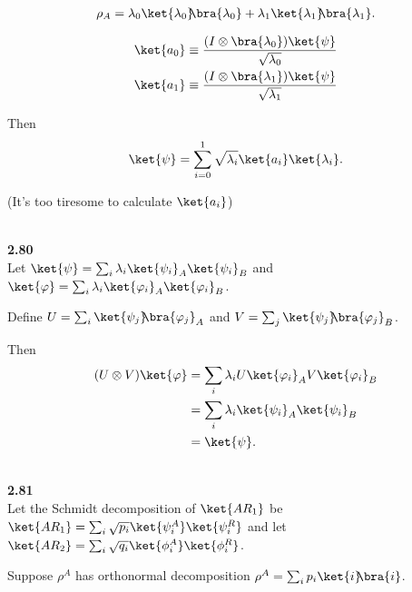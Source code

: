 \documentclass[10pt]{book}
\newcommand{\kb}[1]{\ket{#1}\hspace{-1mm} \bra{#1}} %
\newcommand{\kbt}[2]{\ket{#1}\hspace{-1mm} \bra{#2}} %
\newcommand{\Textbf}[1]{\hspace{3mm}\\ \textbf{#1}\\}
\begin{document}
	\begin{equation}
\begin{aligned}
		\rho_A = \lambda_0 \kb{\lambda_0} + \lambda_1 \kb{\lambda_1}.
	\end{aligned}
\end{equation}
	
	
	\begin{equation}
\begin{aligned}
		\ket{a_0} \equiv \frac{(I \otimes \bra{\lambda_0}) \ket{\psi} }{\sqrt{\lambda_0}}\\
		\ket{a_1} \equiv \frac{(I \otimes \bra{\lambda_1}) \ket{\psi} }{\sqrt{\lambda_1}}
	\end{aligned}
\end{equation}
	
	Then
	\begin{equation}
\begin{aligned}
		\ket{\psi} = \sum_{i=0}^1 \sqrt{\lambda_i} \ket{a_i} \ket{\lambda_i}.
	\end{aligned}
\end{equation}
	
	
	(It's too tiresome to calculate $\ket{a_i}$)
	
	
	
	\Textbf{2.80}
	
	Let $\ket{\psi} = \sum_i \lambda_i \ket{\psi_i}_A \ket{\psi_i}_B$ and $\ket{\varphi} = \sum_i \lambda_i \ket{\varphi_i}_A \ket{\varphi_i}_B$.
	
	Define $U = \sum_i \kbt{\psi_j}{\varphi_j}_A$ and $V = \sum_j \kbt{\psi_j}{\varphi_j}_B$.
	
	Then
	\begin{equation}
\begin{aligned}
		(U \otimes V) \ket{\varphi} &= \sum_i \lambda_i U \ket{\varphi_i}_A  V \ket{\varphi_i}_B\\
		&= \sum_i \lambda_i \ket{\psi_i}_A \ket{\psi_i}_B\\
		&= \ket{\psi}.
	\end{aligned}
\end{equation}
	
	
	\Textbf{2.81}
	
	Let the Schmidt decomposition of $\ket{AR_1}$ be $\ket{AR_1} = \sum_i \sqrt{p_i} \ket{\psi_i^A} \ket{\psi_i^R}$ and
	let $\ket{AR_2} = \sum_i \sqrt{q_i} \ket{\phi_i^A} \ket{\phi_i^R}$.
	
	Suppose $\rho^A$ has orthonormal decomposition $\rho^A = \sum_i p_i \kb{i}$.
	
\end{document}
